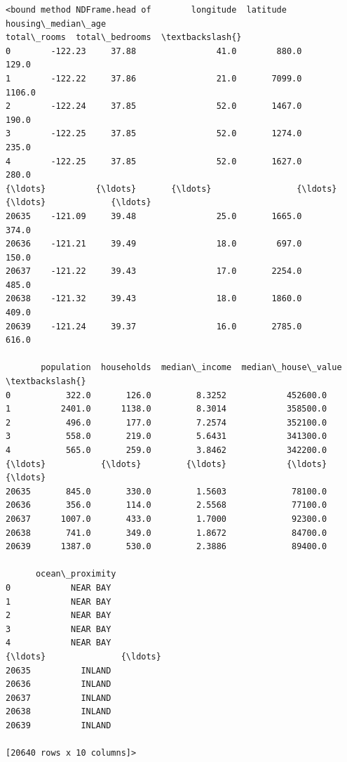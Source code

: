 \documentclass[11pt]{article}
\makeatletter
\newcommand{\boxspacing}{\kern\kvtcb@left@rule\kern\kvtcb@boxsep}
\newcommand{\prompt}[4]{
        {\ttfamily\llap{{\color{#2}[#3]:\hspace{3pt}#4}}\vspace{-\baselineskip}}
    }
\makeatother
\begin{document}
            \begin{tcolorbox}[breakable, size=fbox, boxrule=.5pt, pad at break*=1mm, opacityfill=0]
\prompt{Out}{outcolor}{8}{\boxspacing}
\begin{Verbatim}[commandchars=\\\{\}]
<bound method NDFrame.head of        longitude  latitude  housing\_median\_age
total\_rooms  total\_bedrooms  \textbackslash{}
0        -122.23     37.88                41.0        880.0           129.0
1        -122.22     37.86                21.0       7099.0          1106.0
2        -122.24     37.85                52.0       1467.0           190.0
3        -122.25     37.85                52.0       1274.0           235.0
4        -122.25     37.85                52.0       1627.0           280.0
{\ldots}          {\ldots}       {\ldots}                 {\ldots}          {\ldots}             {\ldots}
20635    -121.09     39.48                25.0       1665.0           374.0
20636    -121.21     39.49                18.0        697.0           150.0
20637    -121.22     39.43                17.0       2254.0           485.0
20638    -121.32     39.43                18.0       1860.0           409.0
20639    -121.24     39.37                16.0       2785.0           616.0

       population  households  median\_income  median\_house\_value  \textbackslash{}
0           322.0       126.0         8.3252            452600.0
1          2401.0      1138.0         8.3014            358500.0
2           496.0       177.0         7.2574            352100.0
3           558.0       219.0         5.6431            341300.0
4           565.0       259.0         3.8462            342200.0
{\ldots}           {\ldots}         {\ldots}            {\ldots}                 {\ldots}
20635       845.0       330.0         1.5603             78100.0
20636       356.0       114.0         2.5568             77100.0
20637      1007.0       433.0         1.7000             92300.0
20638       741.0       349.0         1.8672             84700.0
20639      1387.0       530.0         2.3886             89400.0

      ocean\_proximity
0            NEAR BAY
1            NEAR BAY
2            NEAR BAY
3            NEAR BAY
4            NEAR BAY
{\ldots}               {\ldots}
20635          INLAND
20636          INLAND
20637          INLAND
20638          INLAND
20639          INLAND

[20640 rows x 10 columns]>
\end{Verbatim}
\end{tcolorbox}
        
\end{document}
